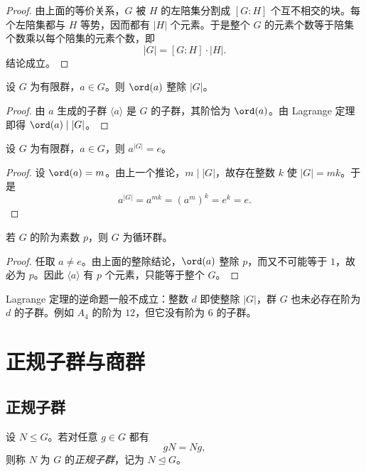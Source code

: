 \begin{proof}
由上面的等价关系，$G$ 被 $H$ 的左陪集分割成 $[G:H]$ 个互不相交的块。每个左陪集都与 $H$ 等势，因而都有 $|H|$ 个元素。于是整个 $G$ 的元素个数等于陪集个数乘以每个陪集的元素个数，即
\[
 |G|=[G:H]\cdot |H|.
\]
结论成立。
\end{proof}

\begin{corollary}
设 $G$ 为有限群，$a\in G$。则 $\ord(a)$ 整除 $|G|$。
\end{corollary}

\begin{proof}
由 $a$ 生成的子群 $\langle a \rangle$ 是 $G$ 的子群，其阶恰为 $\ord(a)$。由 Lagrange 定理即得 $\ord(a)\mid |G|$。
\end{proof}

\begin{corollary}
设 $G$ 为有限群，$a\in G$，则 $a^{|G|}=e$。
\end{corollary}

\begin{proof}
设 $\ord(a)=m$。由上一个推论，$m\mid |G|$，故存在整数 $k$ 使 $|G|=mk$。于是
\[
 a^{|G|}=a^{mk}=(a^m)^k=e^k=e.
\]
\end{proof}

\begin{corollary}
若 $G$ 的阶为素数 $p$，则 $G$ 为循环群。
\end{corollary}

\begin{proof}
任取 $a\ne e$。由上面的整除结论，$\ord(a)$ 整除 $p$，而又不可能等于 $1$，故必为 $p$。因此 $\langle a \rangle$ 有 $p$ 个元素，只能等于整个 $G$。
\end{proof}

\begin{remark}
Lagrange 定理的逆命题一般不成立：整数 $d$ 即使整除 $|G|$，群 $G$ 也未必存在阶为 $d$ 的子群。例如 $A_4$ 的阶为 $12$，但它没有阶为 $6$ 的子群。
\end{remark}

\section{正规子群与商群}

\subsection*{正规子群}

\begin{definition}
设 $N\le G$。若对任意 $g\in G$ 都有
\[
 gN=Ng,
\]
则称 $N$ 为 $G$ 的\emph{正规子群}，记为 $N\trianglelefteq G$。
\end{definition}

